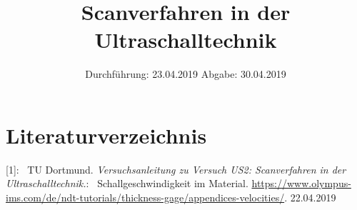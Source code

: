 

\subject{Nr. US2}
\title{Scanverfahren in der Ultraschalltechnik}
\date{%
  Durchführung: 23.04.2019
  \hspace{3em}
  Abgabe: 30.04.2019
}



\maketitle
\thispagestyle{empty}
\tableofcontents
\newpage






\section{Literaturverzeichnis}

[1]: \ TU Dortmund. \textit{Versuchsanleitung zu Versuch US2:
Scanverfahren in der Ultraschalltechnik.}\newline
[2]: \ Schallgeschwindigkeit im Material. 
\url{https://www.olympus-ims.com/de/ndt-tutorials/thickness-gage/appendices-velocities/}. 22.04.2019

\printbibliography{}


